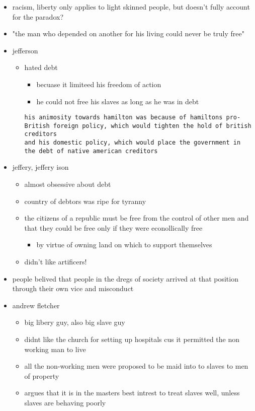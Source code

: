 \documentclass[letterpaper]{article}
\begin{document}
\begin{itemize}
\item racism, liberty only applies to light skinned people, but doesn't
fully account for the paradox?
\item "the man who depended on another for his living could never be truly
free"
\item jefferson

\begin{itemize}
\item hated debt

\begin{itemize}
\item becuase it limiteed his freedom of action
\item he could not free his slaves as long as he was in debt
\end{itemize}

\begin{verbatim}
his animosity towards hamilton was because of hamiltons pro-British foreign policy, which would tighten the hold of british creditors 
and his domestic policy, which would place the government in the debt of native american creditors 
\end{verbatim}
\end{itemize}

\item jeffery, jeffery ison

\begin{itemize}
\item almost obsessive about debt
\item country of debtors was ripe for tyranny
\item the citizens of a republic must be free from the control of other
men and that they could be free only if they were econollically free

\begin{itemize}
\item by virtue of owning land on which to support themselves
\end{itemize}

\item didn't like artificers!
\end{itemize}

\item people belived that people in the dregs of society arrived at that
position through their own vice and misconduct
\item andrew fletcher

\begin{itemize}
\item big libery guy, also big slave guy
\item didnt like the church for setting up hospitals cus it permitted the
non working man to live
\item all the non-working men were proposed to be maid into to slaves to
men of property
\item argues that it is in the masters best intrest to treat slaves well,
unless slaves are behaving poorly


\end{itemize}
\end{itemize}
\end{document}
